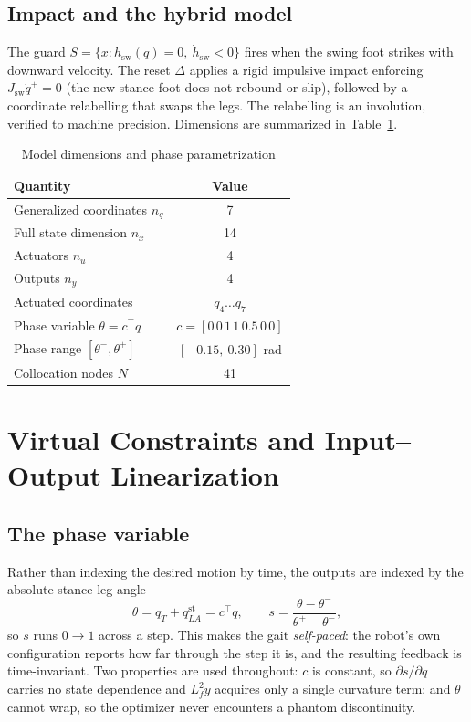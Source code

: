 \documentclass[10pt,conference]{IEEEtran}
\begin{document}
\subsection{Impact and the hybrid model}

The guard $S = \{x : h_{\mathrm{sw}}(q) = 0,\ \dot h_{\mathrm{sw}} < 0\}$ fires
when the swing foot strikes with downward velocity. The reset $\Delta$ applies a
rigid impulsive impact enforcing $J_{\mathrm{sw}}\dot q^+ = 0$ (the new stance
foot does not rebound or slip), followed by a coordinate relabelling that swaps
the legs. The relabelling is an involution, verified to machine precision.
Dimensions are summarized in Table~\ref{tab:dims}.

\begin{table}[t]
\caption{Model dimensions and phase parametrization}
\label{tab:dims}
\centering
\begin{tabular}{lc}
\toprule
Quantity & Value \\
\midrule
Generalized coordinates $n_q$        & 7 \\
Full state dimension $n_x$           & 14 \\
Actuators $n_u$                      & 4 \\
Outputs $n_y$                        & 4 \\
Actuated coordinates                 & $q_4 \ldots q_7$ \\
Phase variable $\theta = c^\top q$   & $c = [0\,0\,1\,1\,0.5\,0\,0]$ \\
Phase range $[\theta^-,\theta^+]$    & $[-0.15,\ 0.30]$ rad \\
Collocation nodes $N$                & 41 \\
\bottomrule
\end{tabular}
\end{table}

\section{Virtual Constraints and Input--Output Linearization}

\subsection{The phase variable}

Rather than indexing the desired motion by time, the outputs are indexed by the
absolute stance leg angle
%
\begin{equation}
\theta = q_T + q_{LA}^{\mathrm{st}} = c^\top q, \qquad
s = \frac{\theta - \theta^-}{\theta^+ - \theta^-},
\end{equation}
%
so $s$ runs $0 \to 1$ across a step. This makes the gait \emph{self-paced}: the
robot's own configuration reports how far through the step it is, and the
resulting feedback is time-invariant. Two properties are used throughout: $c$ is
constant, so $\partial s/\partial q$ carries no state dependence and $L_f^2 y$
acquires only a single curvature term; and $\theta$ cannot wrap, so the
optimizer never encounters a phantom discontinuity.
\end{document}
